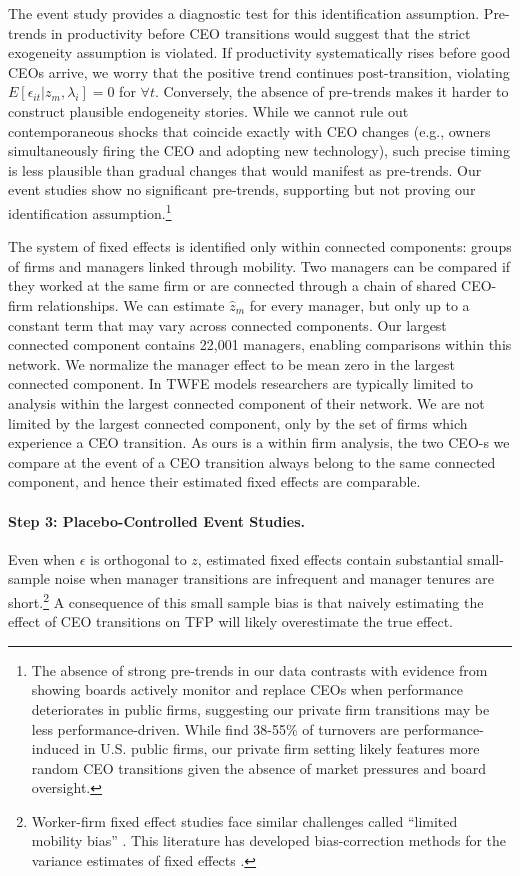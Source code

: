 \documentclass[11pt,a4paper]{article}
\begin{document}
The event study provides a diagnostic test for this identification assumption. Pre-trends in productivity before CEO transitions would suggest that the strict exogeneity assumption is violated. If productivity systematically rises before good CEOs arrive, we worry that the positive trend continues post-transition, violating $E[\epsilon_{it}|z_m, \lambda_i] = 0$ for $\forall t$. Conversely, the absence of pre-trends makes it harder to construct plausible endogeneity stories. While we cannot rule out contemporaneous shocks that coincide exactly with CEO changes (e.g., owners simultaneously firing the CEO and adopting new technology), such precise timing is less plausible than gradual changes that would manifest as pre-trends. Our event studies show no significant pre-trends, supporting but not proving our identification assumption.\footnote{The absence of strong pre-trends in our data contrasts with evidence from \citet{cornelli2013monitoring} showing boards actively monitor and replace CEOs when performance deteriorates in public firms, suggesting our private firm transitions may be less performance-driven. While \citet{jenter2021performance} find 38-55\% of turnovers are performance-induced in U.S. public firms, our private firm setting likely features more random CEO transitions given the absence of market pressures and board oversight.}

The system of fixed effects is identified only within connected components: groups of firms and managers linked through mobility. Two managers can be compared if they worked at the same firm or are connected through a chain of shared CEO-firm relationships. We can estimate $\hat z_m$ for every manager, but only up to a constant term that may vary across connected components. Our largest connected component contains 22,001 managers, enabling comparisons within this network. We normalize the manager effect to be mean zero in the largest connected component.
In TWFE models researchers are typically limited to analysis within the largest connected component of their network. We are not limited by the largest connected component, only by the set of firms which experience a CEO transition. 
As ours is a within firm analysis, the two CEO-s we compare at the event of a CEO transition always belong to the same connected component, and hence their estimated fixed effects are comparable.
\paragraph{Step 3: Placebo-Controlled Event Studies.} Even when $\epsilon$ is orthogonal to $z$, estimated fixed effects contain substantial small-sample noise when manager transitions are infrequent and manager tenures are short.\footnote{Worker-firm fixed effect studies face similar challenges called ``limited mobility bias'' \citep{andrews2008high}. This literature has developed bias-correction methods for the variance estimates of fixed effects \citep{Bonhomme2023-dx, gaure2014correlation}.} A consequence of this small sample bias is that naively estimating the effect of CEO transitions on TFP will likely overestimate the true effect.
\end{document}

